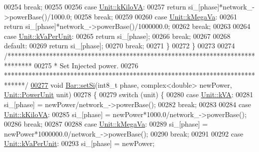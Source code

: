 \begin{DoxyCode}
00254     \textcolor{keywordflow}{break};
00255 
00256   \textcolor{keywordflow}{case} \hyperlink{class_unit_ace265ae255370ccacfd5370337572c3bac9e5154522fbb810d7aed75c3ff47cb2}{Unit::kKiloVA}:
00257     \textcolor{keywordflow}{return} si\_[phase]*network\_->powerBase()/1000.0;
00258     \textcolor{keywordflow}{break};
00259 
00260   \textcolor{keywordflow}{case} \hyperlink{class_unit_ace265ae255370ccacfd5370337572c3ba6039da0ed20f8bee64305bab8bdec365}{Unit::kMegaVa}:
00261     \textcolor{keywordflow}{return} si\_[phase]*network\_->powerBase()/1000000.0;
00262     \textcolor{keywordflow}{break};
00263 
00264   \textcolor{keywordflow}{case} \hyperlink{class_unit_ace265ae255370ccacfd5370337572c3bae056e80d620a87c61a44c359e6b05cc1}{Unit::kVaPerUnit}:
00265     \textcolor{keywordflow}{return} si\_[phase];
00266     \textcolor{keywordflow}{break};
00267 
00268   \textcolor{keywordflow}{default}:
00269     \textcolor{keywordflow}{return} si\_[phase];
00270     \textcolor{keywordflow}{break};
00271   \}
00272 \}
00273 
00274 \textcolor{comment}{/*******************************************************************************}
00275 \textcolor{comment}{ * Set Injected power.}
00276 \textcolor{comment}{ ******************************************************************************/}
\hypertarget{bar_8cpp_source_l00277}{}\hyperlink{group___models_ga85e2a9b8a281900333fd65d1b532acfd}{00277} \textcolor{keywordtype}{void} \hyperlink{group___models_ga85e2a9b8a281900333fd65d1b532acfd}{Bar::setSi}(int8\_t phase, complex<double> newPower, 
      \hyperlink{class_unit_ace265ae255370ccacfd5370337572c3b}{Unit::PowerUnit} unit)
00278 \{
00279   \textcolor{keywordflow}{switch} (unit) \{
00280   \textcolor{keywordflow}{case} \hyperlink{class_unit_ace265ae255370ccacfd5370337572c3ba72b181a842ae2759488a2fa1410d3696}{Unit::kVA}:
00281     si\_[phase] = newPower/network\_->powerBase();
00282     \textcolor{keywordflow}{break};
00283 
00284   \textcolor{keywordflow}{case} \hyperlink{class_unit_ace265ae255370ccacfd5370337572c3bac9e5154522fbb810d7aed75c3ff47cb2}{Unit::kKiloVA}:
00285     si\_[phase] = newPower*1000.0/network\_->powerBase();
00286     \textcolor{keywordflow}{break};
00287 
00288   \textcolor{keywordflow}{case} \hyperlink{class_unit_ace265ae255370ccacfd5370337572c3ba6039da0ed20f8bee64305bab8bdec365}{Unit::kMegaVa}:
00289     si\_[phase] = newPower*1000000.0/network\_->powerBase();
00290     \textcolor{keywordflow}{break};
00291 
00292   \textcolor{keywordflow}{case} \hyperlink{class_unit_ace265ae255370ccacfd5370337572c3bae056e80d620a87c61a44c359e6b05cc1}{Unit::kVaPerUnit}:
00293     si\_[phase] = newPower;

\end{DoxyCode}
